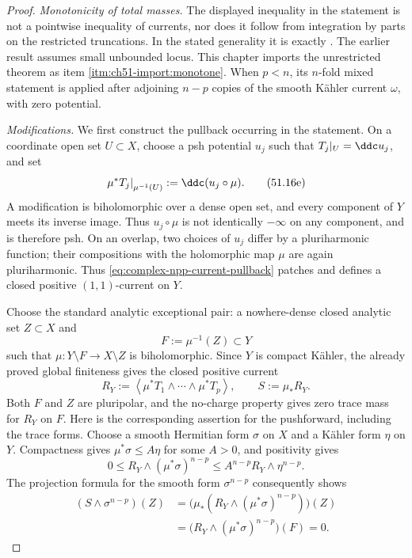 \begin{proof}
\emph{Monotonicity of total masses.}
The displayed inequality in the statement is not a pointwise inequality of
currents, nor does it follow from integration by parts on the restricted
truncations.  In the stated generality it is exactly
\cite[Theorem~1.1]{DDNL18mono}.  The earlier result
\cite[Theorem~1.16]{BEGZ10} assumes small unbounded locus.  This chapter
imports the unrestricted theorem as
item \cref{itm:ch51-import:monotone}.  When $p<n$, its $n$-fold mixed
statement is applied after adjoining $n-p$ copies of the smooth K\"ahler
current $\omega$, with zero potential.

\emph{Modifications.}
We first construct the pullback occurring in the statement.  On a coordinate
open set $U\subset X$, choose a psh potential $u_j$ such that
$T_j|_U=\ddc u_j$, and set
\[
 \left.\mu^*T_j\right|_{\mu^{-1}(U)}
       :=\ddc(u_j\circ\mu).
\tag{51.16e}\label{eq:complex-npp-current-pullback}
\]
A modification is biholomorphic over a dense open set, and every component of
$Y$ meets its inverse image.  Thus $u_j\circ\mu$ is not identically
$-\infty$ on any component, and is therefore psh.  On an overlap, two
choices of $u_j$ differ by a
pluriharmonic function; their compositions with the holomorphic map
$\mu$ are again pluriharmonic.  Thus
\eqref{eq:complex-npp-current-pullback} patches and defines a closed positive
$(1,1)$-current on $Y$.

Choose the standard analytic exceptional pair: a nowhere-dense closed
analytic set $Z\subset X$ and
\[
                         F:=\mu^{-1}(Z)\subset Y
\]
such that $\mu:Y\setminus F\to X\setminus Z$ is biholomorphic.  Since
$Y$ is compact K\"ahler, the already proved global finiteness gives the
closed positive current
\[
 R_Y:=\left\langle
       \mu^*T_1\wedge\cdots\wedge\mu^*T_p\right\rangle,
 \qquad S:=\mu_*R_Y .
\]
Both $F$ and $Z$ are pluripolar, and the no-charge property gives zero
trace mass for $R_Y$ on $F$.  Here is the corresponding assertion for
the pushforward, including the trace forms.  Choose a smooth Hermitian form
$\sigma$ on $X$ and a K\"ahler form $\eta$ on $Y$.  Compactness gives
$\mu^*\sigma\leq A\eta$ for some $A>0$, and positivity gives
\[
 0\leq R_Y\wedge(\mu^*\sigma)^{n-p}
 \leq A^{n-p}R_Y\wedge\eta^{n-p}.
\]
The projection formula for the smooth form $\sigma^{n-p}$ consequently
shows
\[
\begin{aligned}
 (S\wedge\sigma^{n-p})(Z)
 &=\bigl(\mu_*(R_Y\wedge(\mu^*\sigma)^{n-p})\bigr)(Z)\\
 &=\bigl(R_Y\wedge(\mu^*\sigma)^{n-p}\bigr)(F)=0.
\end{aligned}
\tag{51.16f}\label{eq:complex-npp-pushforward-zero-trace}
\]


\end{proof}
